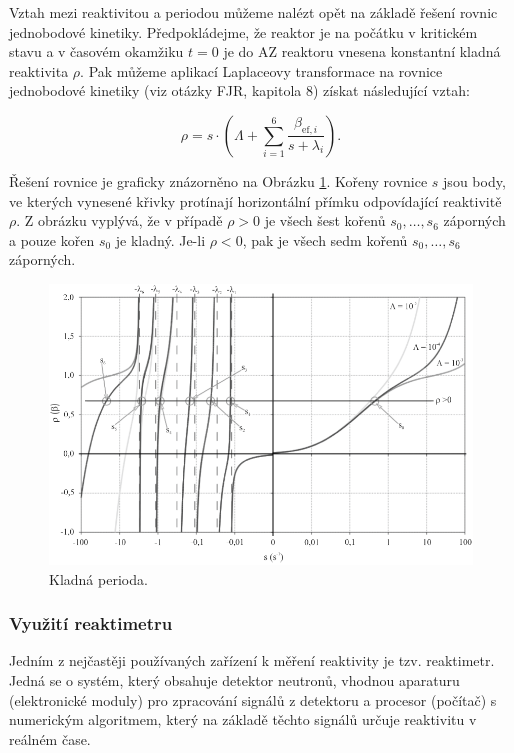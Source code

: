 Vztah mezi reaktivitou a periodou můžeme nalézt opět na základě řešení rovnic jednobodové kinetiky. Předpokládejme, že reaktor je na počátku v kritickém stavu a v časovém okamžiku $ t = 0 $ je do AZ reaktoru vnesena konstantní kladná reaktivita $ \rho $. Pak můžeme aplikací Laplaceovy transformace na rovnice jednobodové kinetiky (viz otázky FJR, kapitola 8) získat následující vztah:

\begin{equation}
\boxed{ \rho = s \cdot \left( \Lambda + \sum_{i=1}^6 \frac{\beta_{\text{ef},i}}{s + \lambda_i} \right).}
\end{equation}

Řešení rovnice je graficky znázorněno na Obrázku \ref{fig:KladnáPeriodaKořeny}. Kořeny rovnice $ s $ jsou body, ve kterých vynesené křivky protínají horizontální přímku odpovídající reaktivitě $ \rho $. Z obrázku vyplývá, že v případě $ \rho > 0 $ je všech šest kořenů $ s_0, \ldots, s_6 $ záporných a pouze kořen $ s_0 $ je kladný. Je-li $ \rho < 0 $, pak je všech sedm kořenů $ s_0, \ldots, s_6 $ záporných.

\begin{figure}[H]
    \centering
    \includegraphics[scale=0.7]{img/KladnáPeriodaKořeny.png}
    \caption{Kladná perioda.}
    \label{fig:KladnáPeriodaKořeny}
\end{figure}

\subsubsection{Využití reaktimetru}

Jedním z nejčastěji používaných zařízení k měření reaktivity je tzv. reaktimetr. Jedná se o systém, který obsahuje detektor neutronů, vhodnou aparaturu (elektronické moduly) pro zpracování signálů z detektoru a procesor (počítač) s numerickým algoritmem, který na základě těchto signálů určuje reaktivitu v reálném čase.


